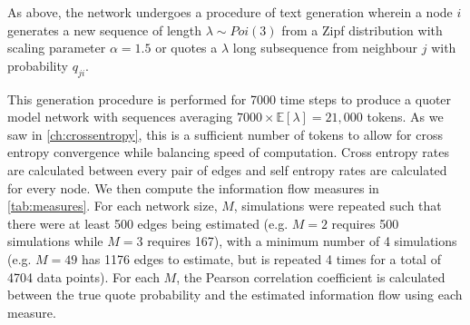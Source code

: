 As above, the network undergoes a procedure of text generation wherein a node $i$ generates a new sequence of length $\lambda \sim Poi(3)$ from a Zipf distribution with scaling parameter $\alpha = 1.5$ or quotes a $\lambda$ long subsequence from neighbour $j$ with probability $q_{ji}$.

This generation procedure is performed for 7000 time steps to produce a quoter model network with sequences averaging $7000\times\mathbb{E}[\lambda]=21,000$ tokens. As we saw in \autoref{ch:crossentropy}, this is a sufficient number of tokens to allow for cross entropy convergence while balancing speed of computation. Cross entropy rates are calculated between every pair of edges and self entropy rates are calculated for every node. We then compute the information flow measures in \autoref{tab:measures}. For each network size, $M$, simulations were repeated such that there were at least 500 edges being estimated (e.g. $M=2$ requires 500 simulations while $M=3$ requires 167), with a minimum number of 4 simulations (e.g. $M=49$ has 1176 edges to estimate, but is repeated 4 times for a total of 4704 data points). For each $M$, the Pearson correlation coefficient is calculated between the true quote probability and the estimated information flow using each measure.

